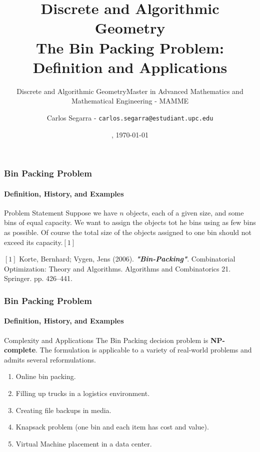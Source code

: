 \documentclass[10pt,    %
    english,            %
    xcolor=table,       %
    envcountsect,        %
    aspectratio=169     %
]{beamer}
\subtitle{Discrete and Algorithmic Geometry} %
\title[The Bin Packing Problem] %
    {\normalsize Discrete and Algorithmic Geometry \\ \Large The Bin Packing Problem: \\ \Large Definition and Applications}
\subtitle{Master in Advanced Mathematics and Mathematical Engineering - MAMME}
\date[\today] %
    {\datedayname, \today}
\author[] %
{Carlos Segarra - \texttt{carlos.segarra@estudiant.upc.edu}}
\begin{document}
\begin{frame}
  \titlepage
\end{frame}

\begin{frame}
    \frametitle{Bin Packing Problem}
    \framesubtitle{Definition, History, and Examples}

    \begin{block}{Problem Statement}
        Suppose we have $n$ objects, each of a given size, and some bins of equal capacity. We want to assign the objects tot he bins using as few bins as possible. Of course the total size of the objects assigned to one bin should not exceed its capacity.$[1]$
    \end{block}


    \small
    \begin{description}
        \item $[1]$ Korte, Bernhard; Vygen, Jens (2006). \textbf{\textit{"Bin-Packing"}}. Combinatorial Optimization: Theory and Algorithms. Algorithms and Combinatorics 21. Springer. pp. 426–441.
    \end{description}

\end{frame}

\begin{frame}
    \frametitle{Bin Packing Problem}
    \framesubtitle{Definition, History, and Examples}

    \begin{alertblock}{Complexity and Applications}
        The Bin Packing decision problem is \textbf{NP-complete}. The formulation is applicable to a variety of real-world problems and admits several reformulations.
    \end{alertblock}

    \begin{enumerate}
        \item Online bin packing.
        \item Filling up trucks in a logistics environment.
        \item Creating file backups in media.
        \item Knapsack problem (one bin and each item has cost and value).
        \item Virtual Machine placement in a data center.
    \end{enumerate}

\end{frame}
\end{document}
